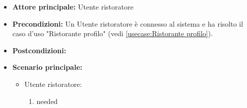 \label{usecase:Feedback lista}
\begin{itemize}
\item \textbf{Attore principale:} Utente ristoratore
\item \textbf{Precondizioni:}
Un Utente ristoratore è connesso al sistema e ha risolto il caso d'uso "Ristorante profilo" (vedi \autoref{usecase:Ristorante profilo}).
\item \textbf{Postcondizioni:}
\item \textbf{Scenario principale:}
\begin{itemize}
\item Utente ristoratore:
\begin{enumerate}
\item needed
\end{enumerate}
\end{itemize}

\end{itemize}
